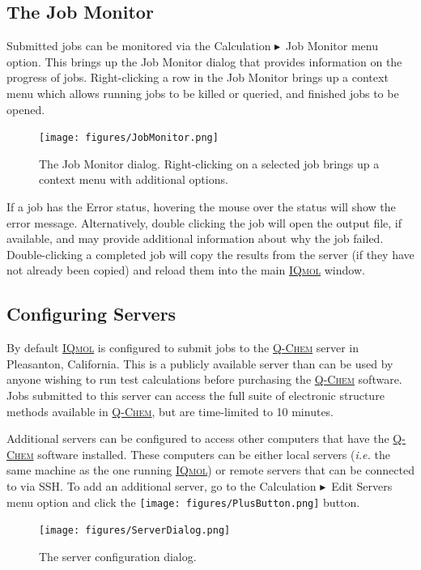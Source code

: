 \documentclass[a4paper,12pt]{article}
\newcommand{\qchem}{\href{http://q-chem.com}{{\scshape Q-Chem}}}
\newcommand{\iqmol}{\href{http://iqmol.org}{{\scshape IQmol}}}
\newcommand{\bt}{\ensuremath{\blacktriangleright}}
\begin{document}
\subsection{The Job Monitor}

Submitted jobs can be monitored via the Calculation \bt\ Job Monitor menu
option.  This brings up the Job Monitor dialog that provides information on the
progress of jobs.  Right-clicking a row in the Job Monitor brings up a context
menu which allows running jobs to be killed or queried, and finished jobs to be
opened.
\begin{figure}
\begin{center}
\texttt{[image: figures/JobMonitor.png]} 
\caption{The Job Monitor dialog.  Right-clicking on a selected job brings up
a context menu with additional options.}
\end{center}
\end{figure}

If a job has the Error status, hovering the mouse over the status will show the
error message.  Alternatively, double clicking the job will open the output
file, if available, and may provide additional information about why the job
failed.  Double-clicking a completed job will copy the results from the
server (if they have not already been copied) and reload them into the main
\iqmol{} window.


\subsection{Configuring Servers}

By default \iqmol{} is configured to submit jobs to the \qchem{} server in
Pleasanton, California.  This is a publicly available server than can be used
by anyone wishing to run test calculations before purchasing the \qchem{}
software.  Jobs submitted to this server can access the full suite of
electronic structure methods available in \qchem{}, but are time-limited to 10
minutes. 

Additional servers can be configured to access other computers that have the
\qchem{} software installed.  These computers can be either local servers
(\emph{i.e.} the same machine as the one running \iqmol{}) or remote servers
that can be connected to via SSH.  To add an additional server, go to the
Calculation \bt\ Edit Servers menu option and click the
\texttt{[image: figures/PlusButton.png]} button.  
\begin{figure}
\begin{center}
\texttt{[image: figures/ServerDialog.png]}
\caption{The server configuration dialog.}
\end{center}
\end{figure}
\end{document}
